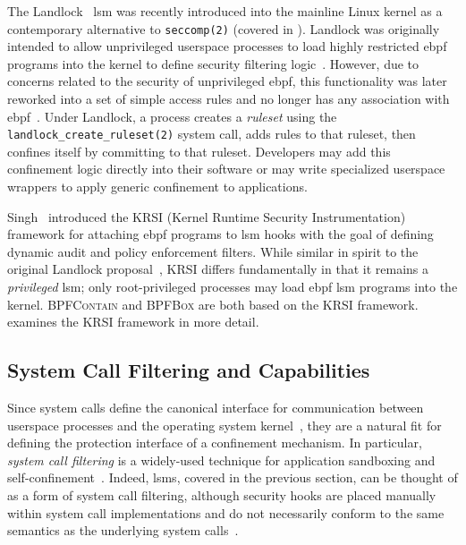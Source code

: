 \documentclass[
  fontsize=12pt,
  titlepage=firstiscover,
  paper=letter,
oneside,
  cleardoublepage=plain,
  parskip=half-,
  DIV=10,
  parindent,
  appendixprefix,
  chapterprefix,
  listof=totoc,
]{scrbook}
\newcommand{\bpfbox}{\textsc{BPFBox}}
\newcommand{\bpfcontain}{\textsc{BPFContain}}
\begin{document}
The Landlock~\cite{salaun_landlockio, salaun_landlock_patch} \gls{lsm} was recently
introduced into the mainline Linux kernel as a contemporary alternative to
\texttt{seccomp(2)} (covered in ). Landlock was originally intended to
allow unprivileged userspace processes to load highly restricted \gls{ebpf} programs into
the kernel to define security filtering logic~\cite{salaun_landlock_patch}. However, due
to concerns related to the security of unprivileged \gls{ebpf}, this functionality was
later reworked into a set of simple access rules and no longer has any association with
\gls{ebpf}~\cite{salaun_landlockio}. Under Landlock, a process creates a \textit{ruleset}
using the \texttt{landlock\_create\_ruleset(2)} system call, adds rules to that ruleset,
then confines itself by committing to that ruleset. Developers may add this confinement
logic directly into their software or may write specialized userspace wrappers to apply
generic confinement to applications.

Singh~\cite{singh2019_krsi} introduced the KRSI (Kernel Runtime Security Instrumentation)
framework for attaching \gls{ebpf} programs to \gls{lsm} hooks with the goal of defining
dynamic audit and policy enforcement filters. While similar in spirit to the original
Landlock proposal~\cite{salaun_landlock_patch}, KRSI differs fundamentally in that it
remains a \textit{privileged} \gls{lsm}; only root-privileged processes may load
\gls{ebpf} \gls{lsm} programs into the kernel. \bpfcontain{} and \bpfbox{} are both based
on the KRSI framework.  examines the KRSI framework in more
detail.





\subsection{System Call Filtering and Capabilities}\label{ss:syscall-filtering}

Since system calls define the canonical interface for communication between userspace
processes and the operating system kernel~\cite{jaeger2008_os_security}, they are
a natural fit for defining the protection interface of a confinement mechanism. In
particular, \textit{system call filtering} is a widely-used technique for application
sandboxing and self-confinement~\cite{anderson2017_comparison}. Indeed, \gls{lsm}s,
covered in the previous section, can be thought of as a form of system call filtering,
although security hooks are placed manually within system call implementations and do not
necessarily conform to the same semantics as the underlying system
calls~\cite{wright2002_lsm}.
\end{document}
